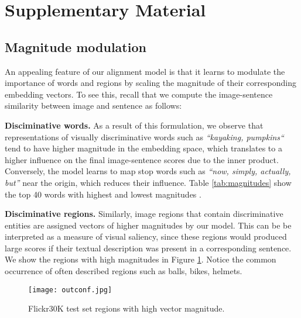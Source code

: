 \documentclass[10pt,twocolumn,letterpaper]{article}
\begin{document}
{\small


}

\clearpage


\section{Supplementary Material}
\subsection{Magnitude modulation}
\vspace{-0.1in}

An appealing feature of our alignment model is that it learns to modulate the importance of words and regions by scaling the magnitude of their corresponding embedding vectors. To see this, recall that we compute the image-sentence similarity between image  and sentence  as follows:

\vspace{-0.1in}

\vspace{-0.15in}

\textbf{Disciminative words.} As a result of this formulation, we observe that representations of visually discriminative words such as \textit{``kayaking, pumpkins``} tend to have higher magnitude in the embedding space, which translates to a higher influence on the final image-sentence scores due to the inner product. Conversely, the model learns to map stop words such as \textit{``now, simply, actually, but''} near the origin, which reduces their influence. Table \ref{tab:magnitudes} show the top 40 words with highest and lowest magnitudes .

\textbf{Disciminative regions.} Similarly, image regions that contain discriminative entities are assigned vectors of higher magnitudes by our model. This can be be interpreted as a measure of visual saliency, since these regions would produced large scores if their textual description was present in a corresponding sentence. We show the regions with high magnitudes in Figure \ref{fig:outconf}. Notice the common occurrence of often described regions such as balls, bikes, helmets.

\begin{figure}[b]
\texttt{[image: outconf.jpg]}
\caption{Flickr30K test set regions with high vector magnitude.}
\label{fig:outconf}
\end{figure}
\end{document}
